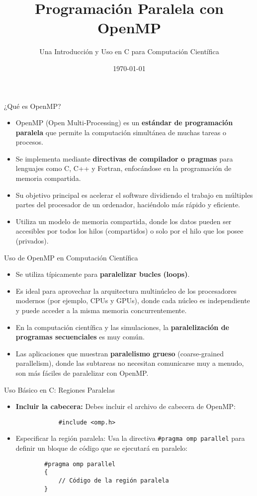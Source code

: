 \documentclass{beamer}
\title{Programación Paralela con OpenMP}
\subtitle{Una Introducción y Uso en C para Computación Científica}
\date{\today}
\begin{document}
\begin{frame}
    \titlepage
\end{frame}

\begin{frame}{¿Qué es OpenMP?}
    \begin{itemize}
        \item OpenMP (Open Multi-Processing) es un \textbf{estándar de programación paralela} que permite la computación simultánea de muchas tareas o procesos.
        \item Se implementa mediante \textbf{directivas de compilador o pragmas} para lenguajes como C, C++ y Fortran, enfocándose en la programación de memoria compartida.
        \item Su objetivo principal es acelerar el software dividiendo el trabajo en múltiples partes del procesador de un ordenador, haciéndolo más rápido y eficiente.
        \item Utiliza un modelo de memoria compartida, donde los datos pueden ser accesibles por todos los hilos (compartidos) o solo por el hilo que los posee (privados).
    \end{itemize}
\end{frame}

\begin{frame}{Uso de OpenMP en Computación Científica}
    \begin{itemize}
        \item Se utiliza típicamente para \textbf{paralelizar bucles (loops)}.
        \item Es ideal para aprovechar la arquitectura multinúcleo de los procesadores modernos (por ejemplo, CPUs y GPUs), donde cada núcleo es independiente y puede acceder a la misma memoria concurrentemente.
        \item En la computación científica y las simulaciones, la \textbf{paralelización de programas secuenciales} es muy común.
        \item Las aplicaciones que muestran \textbf{paralelismo grueso} (coarse-grained parallelism), donde las subtareas no necesitan comunicarse muy a menudo, son más fáciles de paralelizar con OpenMP.
    \end{itemize}
\end{frame}

\begin{frame}[containsverbatim]{Uso Básico en C: Regiones Paralelas}
    \begin{itemize}
        \item \textbf{Incluir la cabecera:} Debes incluir el archivo de cabecera de OpenMP:
        \begin{verbatim}
            #include <omp.h>
        \end{verbatim}
    \item Especificar la región paralela: Usa la directiva \texttt{\#pragma omp parallel} para definir un bloque de código que se ejecutará en paralelo:
        \begin{verbatim}
        #pragma omp parallel
        {
            // Código de la región paralela
        }
    \end{verbatim}
\end{itemize}
\end{frame}
\end{document}
